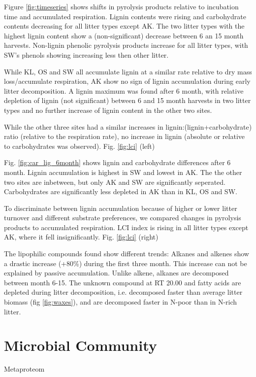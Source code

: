 Figure \ref{fig:timeseries} shows shifts in pyrolysis products relative to incubation time and accumulated respiration. Lignin contents were rising and carbohydrate contents decreasing for all litter types except AK. The two litter types with the highest lignin content show a (non-significant) decrease between 6 an 15 month harvests. Non-lignin phenolic pyrolysis products increase for all litter types, with SW's phenols showing increasing less then other litter.

While KL, OS and SW all accumulate lignin at a similar rate relative to dry mass loss/accumulate respiration, AK show no sign of lignin accumulation during early litter decomposition. A lignin maximum was found after 6 month, with relative depletion of lignin (not significant) between 6 and 15 month harvests in two litter types and no further increase of lignin content in the other two sites. 

While the other three sites had a similar increases in lignin:(lignin+carbohydrate) ratio (relative to the respiration rate), no increase in lignin (absolute or relative to carbohydrates was observed). Fig. \ref{fig:lci} (left)

Fig. \ref{fig:car_lig_6month} shows lignin and carbohydrate differences after 6 month. Lignin accumulation is highest in SW and lowest in AK. The the other two sites are inbetween, but only AK and SW are significantly seperated. Carbohydrates are significantly less depleted in AK than in KL, OS and SW. 

To discriminate between lignin accumulation because of higher or lower litter turnover and different substrate preferences, we compared changes in pyrolysis products to accumulated respiration. LCI index is rising in all litter types except AK, where it fell insignificantly.
Fig. \ref{fig:lci} (right)

The lipophilic compounds found show different trends: Alkanes and alkenes show a drastic increase (+80\%) during the first three month. This increase can not be explained by passive accumulation. Unlike alkene, alkanes are decomposed between month 6-15. The unknown compound at RT 20.00 and fatty acids are depleted during litter decomposition, i.e. decomposed faster than average litter biomass (fig \ref{fig:waxes}), and are decomposed faster in N-poor than in N-rich litter. 



\section{Microbial Community}

Metaproteom
